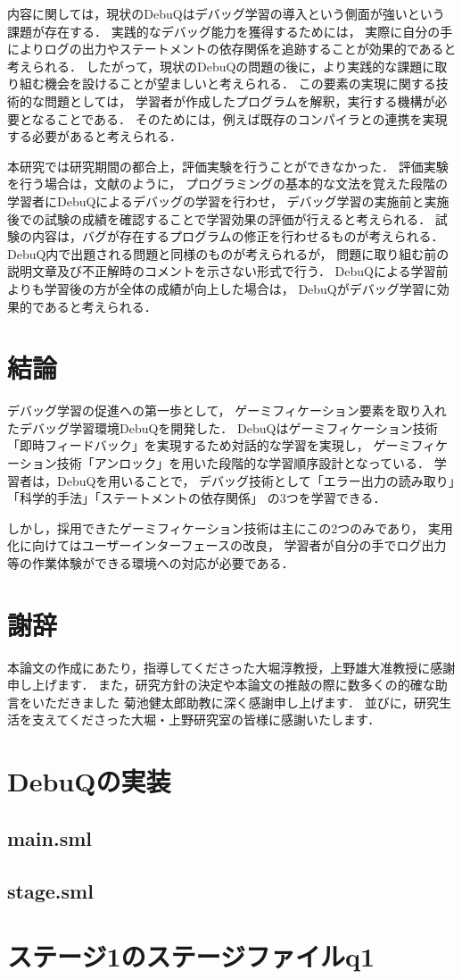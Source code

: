 \documentclass{jreport}
\begin{document}
内容に関しては，現状のDebuQはデバッグ学習の導入という側面が強いという課題が存在する．
実践的なデバッグ能力を獲得するためには，
実際に自分の手によりログの出力やステートメントの依存関係を追跡することが効果的であると考えられる．
したがって，現状のDebuQの問題の後に，より実践的な課題に取り組む機会を設けることが望ましいと考えられる．
この要素の実現に関する技術的な問題としては，
学習者が作成したプログラムを解釈，実行する機構が必要となることである．
そのためには，例えば既存のコンパイラとの連携を実現する必要があると考えられる．

本研究では研究期間の都合上，評価実験を行うことができなかった．
評価実験を行う場合は，文献\cite{Yama}のように，
プログラミングの基本的な文法を覚えた段階の学習者にDebuQによるデバッグの学習を行わせ，
デバッグ学習の実施前と実施後での試験の成績を確認することで学習効果の評価が行えると考えられる．
試験の内容は，バグが存在するプログラムの修正を行わせるものが考えられる．
DebuQ内で出題される問題と同様のものが考えられるが，
問題に取り組む前の説明文章及び不正解時のコメントを示さない形式で行う．
DebuQによる学習前よりも学習後の方が全体の成績が向上した場合は，
DebuQがデバッグ学習に効果的であると考えられる．

\chapter{結論}
デバッグ学習の促進への第一歩として，
ゲーミフィケーション要素を取り入れたデバッグ学習環境DebuQを開発した．
DebuQはゲーミフィケーション技術「即時フィードバック」を実現するため対話的な学習を実現し，
ゲーミフィケーション技術「アンロック」を用いた段階的な学習順序設計となっている．
学習者は，DebuQを用いることで，
デバッグ技術として「エラー出力の読み取り」「科学的手法」「ステートメントの依存関係」
の3つを学習できる．

しかし，採用できたゲーミフィケーション技術は主にこの2つのみであり，
実用化に向けてはユーザーインターフェースの改良，
学習者が自分の手でログ出力等の作業体験ができる環境への対応が必要である．

\chapter*{謝辞}
本論文の作成にあたり，指導してくださった大堀淳教授，上野雄大准教授に感謝申し上げます．
また，研究方針の決定や本論文の推敲の際に数多くの的確な助言をいただきました
菊池健太郎助教に深く感謝申し上げます．
並びに，研究生活を支えてくださった大堀・上野研究室の皆様に感謝いたします．

\appendix
\chapter{DebuQの実装}
\section{main.sml}
\label{app:main.sml}

\section{stage.sml}
\label{app:stage.sml}

\chapter{ステージ1のステージファイルq1}
\label{app:q1}



\end{document}

